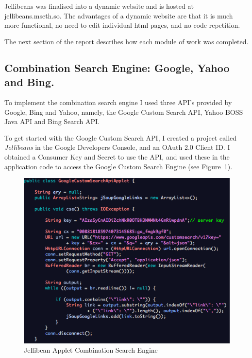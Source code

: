 \documentclass[a4paper, 11pt]{article}
\begin{document}
\vspace{5mm}
Jellibeans was finalised into a dynamic website and is hosted at jellibeans.mseth.so. The advantages of a dynamic website are that it is much more functional, no need to edit individual html pages, and no code repetition. 

\vspace{5mm}
The next section of the report describes how each module of work was completed.

\subsection{Combination Search Engine: Google, Yahoo and Bing.} 
To implement the combination search engine I used three API's provided by Google, Bing and Yahoo, namely, the Google Custom Search API, Yahoo BOSS Java API and Bing Search API. 

\vspace{5mm}
To get started with the Google Custom Search API, I created a project called \textit{Jellibeans} in the Google Developers Console, and an OAuth 2.0 Client ID. I obtained a Consumer Key and Secret to use the API, and used these in the application code to access the Google Custom Search Engine (see Figure~\ref{JBeanAppletGoogleCustomSearch1}). 

\begin{figure}[H]
\begin{center}
\includegraphics[scale=0.7]{JBeanAppletGoogleCustomSearch}
\end{center}

\caption{Jellibean Applet Combination Search Engine}
\label{JBeanAppletGoogleCustomSearch1}
\end{figure}
\end{document}
